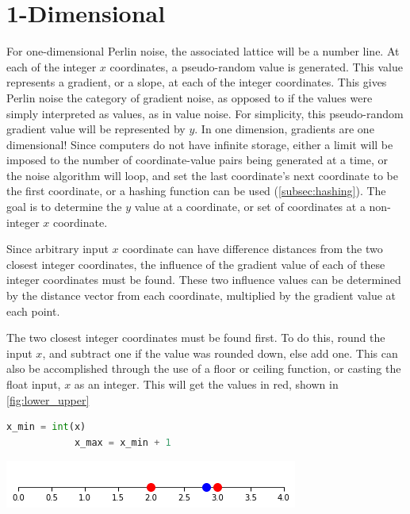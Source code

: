 \documentclass[10pt]{report}
\begin{document}
		\section{1-Dimensional} \label{sec:1d}
		
		For one-dimensional Perlin noise, the associated lattice will be a number line. At each of the integer \(x\) coordinates, a pseudo-random value is generated. This value represents a gradient, or a slope, at each of the integer coordinates. This gives Perlin noise the category of gradient noise, as opposed to if the values were simply interpreted as values, as in value noise. For simplicity, this pseudo-random gradient value will be represented by \(y\). In one dimension, gradients are one dimensional! Since computers do not have infinite storage, either a limit will be imposed to the number of coordinate-value pairs being generated at a time, or the noise algorithm will loop, and set the last coordinate's next coordinate to be the first coordinate, or a hashing function can be used (\ref{subsec:hashing}). The goal is to determine the \(y\) value at a coordinate, or set of coordinates at a non-integer \(x\) coordinate.
		
		Since arbitrary input \(x\) coordinate can have difference distances from the two closest integer coordinates, the influence of the gradient value of each of these integer coordinates must be found. These two influence values can be determined by the distance vector from each coordinate, multiplied by the gradient value at each point. 
		
		The two closest integer coordinates must be found first. To do this, round the input \(x\), and subtract one if the value was rounded down, else add one. This can also be accomplished through the use of a floor or ceiling function, or casting the float input, \(x\) as an integer. This will get the values in red, shown in \autoref{fig:lower_upper}
		
		\begin{lstlisting}[label={lst:minmax}, language=Python, frame=none, caption={An example of finding the min and max bounds in 1D Perlin noise, given input x.}, captionpos=b]
			x_min = int(x)
			x_max = x_min + 1
		\end{lstlisting}
	
		\begin{minipage}{\textwidth}
			\centering
			\includegraphics[scale=0.75]{lower_upper}
			\label{fig:lower_upper}
		\end{minipage}
	
\end{document}
